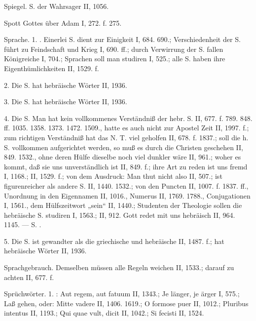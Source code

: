 Spiegel. S. der Wahrsager II, 1056.

Spott Gottes über Adam I, 272. f. 275.

Sprache. 1. . Einerlei S. dient zur Einigkeit I, 684. 690.; Verschiedenheit der S. führt zu Feindschaft und Krieg I, 690. ff.; durch Verwirrung der S. fallen Königreiche I, 704.; Sprachen soll man studiren I, 525.; alle S. haben ihre Eigenthümlichkeiten II, 1529. f.

2. Die  S. hat hebräische Wörter II, 1936.

3. Die  S. hat hebräische Wörter II, 1936.

4. Die  S. Man hat kein vollkommenes Verständniß der hebr. S. II, 677. f. 789. 848. ff. 1035. 1358. 1373. 1472. 1509., hatte es auch nicht zur Apostel Zeit II, 1997. f.; zum richtigen Verständniß hat das N. T. viel geholfen II, 678. f. 1837.; soll die h. S. vollkommen aufgerichtet werden, so muß es durch die Christen geschehen II, 849. 1532., ohne deren Hülfe dieselbe noch viel dunkler wäre II, 961.; woher es kommt, daß sie uns unverständlich ist II, 849. f.; ihre Art zu reden ist uns fremd I, 1168.; II, 1529. f.; von dem Ausdruck: Man thut nicht also II, 507.; ist figurenreicher als andere S. II, 1440. 1532.; von den Puncten II, 1007. f. 1837. ff., Unordnung in den Eigennamen II, 1016., Numerus II, 1769. 1788., Conjugationen I, 1561., dem Hülfszeitwort „sein“ II, 1440.; Studenten der Theologie sollen die hebräische S. studiren I, 1563.; II, 912. Gott redet mit uns hebräisch II, 964. 1145. — S. .

5. Die  S. ist gewandter als die griechische und hebräische II, 1487. f.; hat hebräische Wörter II, 1936.

Sprachgebrauch. Demselben müssen alle Regeln weichen II, 1533.; darauf zu achten II, 677. f.

Sprüchwörter. 1. : Aut regem, aut fatuum II, 1343.; Je länger, je ärger I, 575.; Laß gehen, oder: Mitte vadere II, 1406. 1619.; O formose puer II, 1012.; Pluribus intentus II, 1193.; Qui quae vult, dicit II, 1042.; Si fecisti II, 1524.

